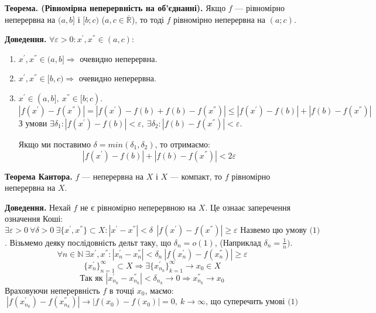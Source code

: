 \documentclass[12pt]{report}
\begin{document}
\vspace{5mm}

\textbf{Теорема. (Рівномірна неперервність на об'єднанні).} Якщо $f$ --- рівномірно неперервна на $(a,b]$ і $[b;c)$ ($a, c \in \overline{\mathbb{R}}$), то тоді $f$ рівномірно неперервна на $(a;c)$.

\textbf{Доведення.} $\forall \varepsilon > 0 : x^{'}, x^{''} \in (a,c)$:

\begin{enumerate}
	\item $x^{'}, x^{''} \in (a,b] \Longrightarrow $ очевидно неперервна.
	\item $x^{'}, x^{''} \in [b,c) \Longrightarrow $ очевидно неперервна.
	\item $x^{'} \in (a, b], \ x^{''} \in [b;c).$
		$$|f(x^{'}) - f(x^{''})| = |f(x^{'}) -f(b) + f(b) - f(x^{''}) | \leq  |f(x^{'}) -f(b)|  + |f(b) - f(x^{''}) | $$
		З умови $ \exists \delta_1 :  |f(x^{'}) -f(b)| < \varepsilon,\ \exists \delta_2 :  |f(b) - f(x^{''}) | < \varepsilon$.
		
		Якщо ми поставимо $ \delta = min ( \delta_1, \delta_2)$, то отримаємо:
		$$ |f(x^{'}) -f(b)| + |f(b) - f(x^{''}) | < 2 \varepsilon $$
\end{enumerate}

\vspace{3mm}

\textbf{Теорема Кантора.} $f$ --- неперервна на $X$ і $X$ --- компакт, то $f$ рівномірно неперервна на $X$.

\textbf{Доведення.} Нехай $f$ не є рівномірно неперервною на $X$. Це ознаає заперечення означення Коші:
$$\exists \varepsilon > 0\ \forall \delta > 0\ \exists \{ x^{'},  x^{''}\} \subset X : | x^{'} -  x^{''}| < \delta \ \ |f( x^{'})  - f( x^{''}) | \geq \varepsilon \textrm{ Назвемо цю умову (1)}$$.
Візьмемо деяку послідовність дельт таку, що $\delta_n = o(1)$, (Наприклад $ \delta_n = \frac{1}{n}).$
$$\forall n\in \mathbb{N} \ \exists  x^{'},  x^{''} : | x^{'}_n -  x^{''}_n| < \delta_n\ |f( x^{'}_n) - f( x^{''}_n)| \geq \varepsilon $$
$$ \{x^{'}_n\}_{n=1}^{\infty} \subset X \Longrightarrow \exists \{x^{'}_{n_k}\}_{k=1}^{\infty} \to x_0 \in X$$
$$\textrm{Так як } | x^{'}_{n_k} -  x^{''}_{n_k} | < \delta_{n_k} \to 0 \Longrightarrow  x^{''}_{n_k} \to x_0$$
Враховуючи неперервність $f$ в точці $x_0$, маємо:
$$|f( x^{'}_{n_k}) - f( x^{''}_{n_k})| \to |f(x_0) - f(x_0)| = 0,\ k \to \infty \textrm{, що суперечить умові (1)}$$

\vspace{3mm}
\end{document}

